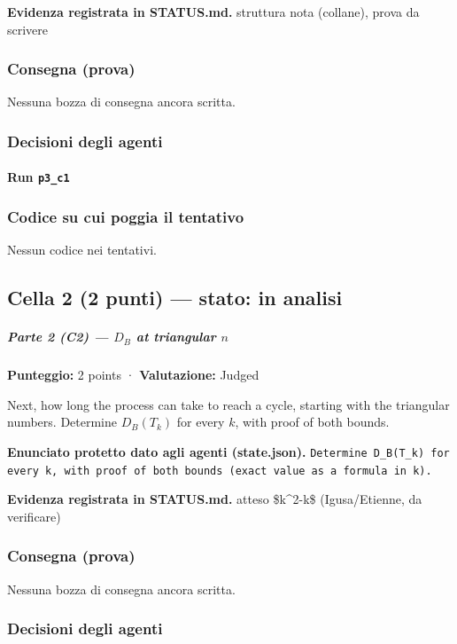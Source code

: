 \documentclass[11pt,a4paper]{article}
\begin{document}
\textbf{Evidenza registrata in STATUS.md.} struttura nota (collane), prova da scrivere

\subsubsection{Consegna (prova)}
Nessuna bozza di consegna ancora scritta.

\subsubsection{Decisioni degli agenti}
\paragraph{Run \texttt{p3\_c1}}

\subsubsection{Codice su cui poggia il tentativo}
Nessun codice nei tentativi.

\subsection{Cella 2 (2 punti) — stato: in analisi}
\subparagraph{\texorpdfstring{Parte 2 (C2) --- \(D_B\) at triangular
\(n\)}{Parte 2 (C2) --- D\_B at triangular n}}\label{parte-2-c2-d_b-at-triangular-n}

\textbf{Punteggio:} 2 points · \textbf{Valutazione:} Judged

Next, how long the process can take to reach a cycle, starting with the
triangular numbers. Determine \(D_B(T_k)\) for every \(k\), with proof
of both bounds.

\textbf{Enunciato protetto dato agli agenti (state.json).} \texttt{Determine D\_B(T\_k) for every k, with proof of both bounds (exact value as a formula in k).}

\textbf{Evidenza registrata in STATUS.md.} atteso \$k\textasciicircum{}2-k\$ (Igusa/Etienne, da verificare)

\subsubsection{Consegna (prova)}
Nessuna bozza di consegna ancora scritta.

\subsubsection{Decisioni degli agenti}
\end{document}
